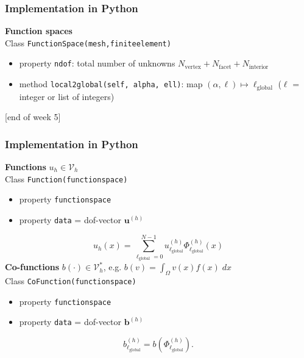 \documentclass{beamer}
\begin{document}
\begin{frame}[fragile]
  \frametitle{Implementation in Python}
  \textbf{Function spaces}\\
  Class \lstinline{FunctionSpace(mesh,finiteelement)}
  \begin{itemize}
  \item property \lstinline{ndof}: total number of unknowns $N_{\text{vertex}}+N_{\text{facet}}+N_{\text{interior}}$
  \item method \lstinline{local2global(self, alpha, ell)}: map $(\alpha,\ell)\mapsto\ell_{\text{global}}$ {\footnotesize($\ell$ = integer or list of integers)}
  \end{itemize}
  {\begin{flushright} {\footnotesize [end of week 5]} \end{flushright}}
\end{frame}


\begin{frame}[fragile]
  \frametitle{Implementation in Python}
  \textbf{Functions} $u_h\in\mathcal{V}_h$\\[1ex]
  Class \lstinline{Function(functionspace)}
  \begin{itemize}
    \item property \lstinline{functionspace}
    \item property \lstinline{data} = dof-vector $\boldsymbol{u}^{(h)}$
  \end{itemize}
$$
u_h(x) = \sum_{\ell_{\text{global}}=0}^{N-1} u^{(h)}_{\ell_{\text{global}}} \Phi^{(h)}_{\ell_{\text{global}}}(x)
$$
\vfill
\textbf{Co-functions} $b(\cdot)\in\mathcal{V}_h^*$, e.g. $b(v) = \int_\Omega v(x) f(x)\;dx$\\[1ex]
  Class \lstinline{CoFunction(functionspace)}
  \begin{itemize}
    \item property \lstinline{functionspace}
    \item property \lstinline{data} = dof-vector $\boldsymbol{b}^{(h)}$
  \end{itemize}
$$
b^{(h)}_{\ell_{\text{global}}} = b\left(\Phi^{(h)}_{\ell_{\text{global}}}\right).
$$
\end{frame}

\end{document}
